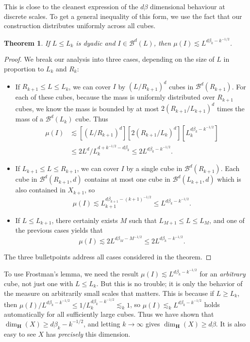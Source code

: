 \documentclass[usenames,dvipsnames]{article}
\theoremstyle{plain}
\theoremstyle{plain}
\newtheorem{theorem}{Theorem}
\begin{document}
This is close to the cleanest expression of the $d \beta$ dimensional behaviour at discrete scales. To get a general inequality of this form, we use the fact that our construction distributes uniformly across all cubes.

\begin{theorem}
	If $L \leq L_k$ is dyadic and $I \in \mathcal{B}^d(L)$, then $\mu(I) \lesssim L^{d\beta_k - k^{-1/2}}$.
\end{theorem}
\begin{proof}
	We break our analysis into three cases, depending on the size of $L$ in proportion to $L_k$ and $R_k$:
	\begin{itemize}
		\item If $R_{k+1} \leq L \leq L_k$, we can cover $I$ by $(L/R_{k+1})^d$ cubes in $\mathcal{B}^d(R_{k+1})$. For each of these cubes, because the mass is uniformly distributed over $R_{k+1}$ cubes, we know the mass is bounded by at most $2(R_{k+1}/L_{k+1})^d$ times the mass of a $\mathcal{B}^d(L_k)$ cube. Thus
		\begin{align*}
			\mu(I) &\lesssim [(L/R_{k+1})^d] [2(R_{k+1}/L_k)^d] [L_k^{d \beta_k - k^{-1/2}}]\\
			&\leq 2 L^d / L_k^{d + k^{-1/2} - d \beta_k} \leq 2 L^{d \beta_k - k^{-1/2}}.
		\end{align*}

		\item If $L_{k+1} \leq L \leq R_{k+1}$, we can cover $I$ by a single cube in $\mathcal{B}^d(R_{k+1})$. Each cube in $\mathcal{B}^d(R_{k+1},d)$ contains at most one cube in $\mathcal{B}^d(L_{k+1},d)$ which is also contained in $X_{k+1}$, so
		\[ \mu(I) \lesssim L_{k+1}^{d\beta_{k+1} - (k+1)^{-1/2}} \leq L^{d \beta_k - k^{-1/2}}. \]

		\item If $L \leq L_{k+1}$, there certainly exists $M$ such that $L_{M+1} \leq L \leq L_M$, and one of the previous cases yields that
		\[ \mu(I) \lesssim 2 L^{d \beta_M - M^{-1/2}} \leq 2 L^{d \beta_k - k^{-1/2}}. \]
	\end{itemize}
	The three bulletpoints address all cases considered in the theorem.
\end{proof}

To use Frostman's lemma, we need the result $\mu(I) \lesssim L^{d \beta_k - k^{-1/2}}$ for an {\it arbitrary} cube, not just one with $L \leq L_k$. But this is no trouble; it is only the behavior of the measure on arbitrarily small scales that matters. This is because if $L \geq L_k$, then $\mu(I)/L^{d \beta_k - k^{-1/2}} \leq 1/L_k^{d \beta_k - k^{-1/2}} \lesssim_k 1$, so $\mu(I) \lesssim_k L^{d \beta_k - k^{-1/2}}$ holds automatically for all sufficiently large cubes. Thus we have shown that $\dim_{\mathbf{H}}(X) \geq d \beta_k - k^{-1/2}$, and letting $k \to \infty$ gives $\dim_{\mathbf{H}}(X) \geq d \beta$. It is also easy to see $X$ has {\it precisely} this dimension.
\end{document}
